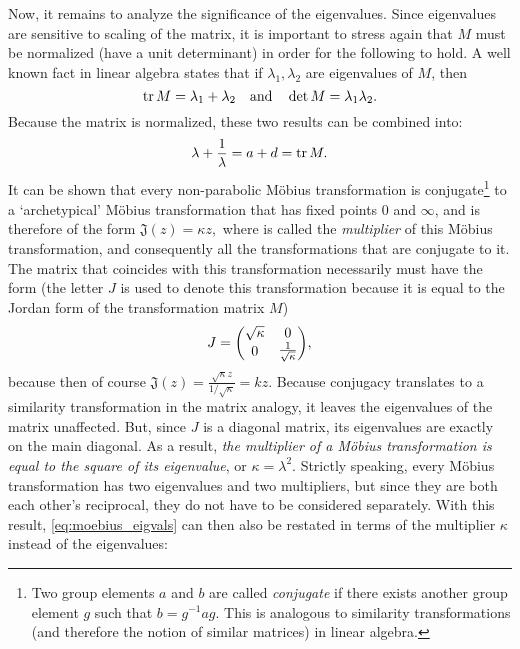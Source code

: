 Now, it remains to analyze the significance of the eigenvalues. Since eigenvalues are sensitive to scaling of the matrix, it is important to stress again that \(M\) must be normalized (have a unit determinant) in order for the following to hold. A well known fact in linear algebra states that if \(\lambda_1, \lambda_2\) are eigenvalues of \(M\), then
\[ \trace{M} = \lambda_1 + \lambda_2 \quad\text{and}\quad \det M  = \lambda_1 \lambda_2.\]
Because the matrix is normalized, these two results can be combined into:
\begin{equation}
    \lambda + \frac{1}{\lambda} = a + d = \trace{M}.
    \label{eq:moebius_eigvals}
\end{equation}
It can be shown that every non-parabolic Möbius transformation is conjugate\footnote{Two group elements \(a\) and \(b\) are called \emph{conjugate} if there exists another group element \(g\) such that \(b = g^{-1}ag\). This is analogous to similarity transformations (and therefore the notion of similar matrices) in linear algebra. } to a `archetypical' Möbius transformation  that has fixed points 0 and \(\infty\), and is therefore of the form
\(\mathfrak{J}(z) = \kappa z,\)
where  is called the \emph{multiplier} of this Möbius transformation, and consequently all the transformations that are conjugate to it. The matrix  that coincides with this transformation necessarily must have the form (the letter \(J\) is used to denote this transformation because it is equal to the Jordan form of the transformation matrix \(M\)) \cite{Needham1997}
\[J = \mqty(\dmat[0]{\sqrt{\kappa}, \frac{1}{\sqrt{\kappa}}}), \]
because then of course \(\mathfrak{J}(z) = \frac{\sqrt{\kappa}z}{1/\sqrt{\kappa}} = kz\). Because conjugacy translates to a similarity transformation in the matrix analogy, it leaves the eigenvalues of the matrix unaffected. But, since \(J\) is a diagonal matrix, its eigenvalues are exactly on the main diagonal. As a result, \emph{the multiplier of a Möbius transformation is equal to the square of its eigenvalue}, or \(\kappa = \lambda^2\). Strictly speaking, every Möbius transformation has two eigenvalues and two multipliers, but since they are both each other's reciprocal, they do not have to be considered separately. With this result, \cref{eq:moebius_eigvals} can then also be restated in terms of the multiplier \(\kappa\) instead of the eigenvalues:

